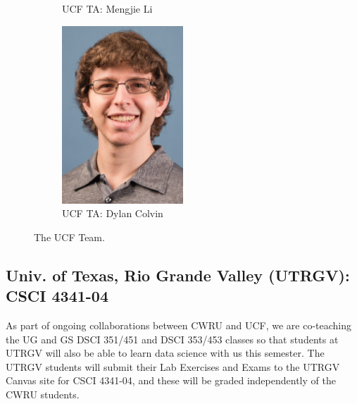 \documentclass[10pt]{article} %
\begin{document}
\begin{figure}[htbp]
\begin{subfigure}{0.3\linewidth}
        \caption{UCF TA: Mengjie Li}
        \label{fig:mengjie}
      \end{subfigure}
      \begin{subfigure}{0.3\linewidth}
        \centering
        \includegraphics[width=0.5\textwidth]{figs/Dylan_Colvin.jpg}
        \caption{UCF TA: Dylan Colvin}
        \label{fig:dylan}
      \end{subfigure}
      \caption{The UCF Team.}
      \label{fig:UCF}
    \end{figure}

  \subsection{Univ. of Texas, Rio Grande Valley (UTRGV): CSCI 4341-04}

    As part of ongoing collaborations between CWRU and UCF, we are co-teaching the UG and GS DSCI 351/451 and DSCI 353/453 classes so that students at UTRGV will also be able to learn data science with us this semester. The UTRGV students will submit their Lab Exercises and Exams to the UTRGV Canvas site for CSCI 4341-04, and these will be graded independently of the CWRU students.
\end{document}
